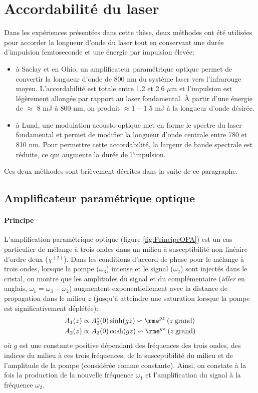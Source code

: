 \section{Accordabilité du laser}
\label{sec:Accordabilité}
Dans les expériences présentées dans cette thèse, deux méthodes ont été utilisées pour accorder la longueur d'onde du laser tout en conservant une durée d'impulsion femtoseconde et une énergie par impulsion élevée:
\begin{itemize}[label=--,leftmargin=*]
\item à Saclay et en Ohio, un amplificateur paramétrique optique permet de convertir la longueur d'onde de 800 nm du système laser vers l'infrarouge moyen. L'accordabilité est totale entre 1.2 et 2.6 $\mu$m et l'impulsion est légèrement allongée par rapport au laser fondamental. \`{A} partir d'une énergie de $\approx$ 8 mJ à 800 nm, on produit $\approx 1 - 1.5$ mJ à la longueur d'onde désirée.
\item à Lund, une modulation acousto-optique met en forme le spectre du laser fondamental et permet de modifier la longueur d'onde centrale entre 780 et 810 nm. Pour permettre cette accordabilité, la largeur de bande spectrale est réduite, ce qui augmente la durée de l'impulsion.
\end{itemize}
Ces deux méthodes sont brièvement décrites dans la suite de ce paragraphe.
\subsection{Amplificateur paramétrique optique}
\label{subsec:OPA}
\paragraph{Principe} L'amplification paramétrique optique (figure \ref{fig:PrincipeOPA}) est un cas particulier de mélange à trois ondes dans un milieu à susceptibilité non linéaire d'ordre deux ($\chi^{(2)}$). Dans les conditions d'accord de phase pour le mélange à trois ondes, lorsque la pompe ($\omega_3$) intense et le signal ($\omega_2$) sont injectés dans le cristal, on montre que les amplitudes du signal et du complémentaire (\textit{idler} en anglais, $\omega_1 = \omega_3 - \omega_2$) augmentent exponentiellement avec la distance de propagation dans le milieu $z$  (jusqu'à atteindre une saturation lorsque la pompe est significativement déplétée):
\begin{align}
A_1(z) & \propto A_2^*(0) \sinh(gz) \backsim \rme^{gz} \: (z \: \text{grand})\\
A_2(z) & \propto A_2(0) \cosh(gz) \backsim \rme^{gz} \: (z \: \text{grand}) 
\end{align}
où $g$ est une constante positive dépendant des fréquences des trois ondes, des indices du milieu à ces trois fréquences, de la susceptibilité du milieu  et de l'amplitude de la pompe (considérée comme constante). Ainsi, on constate à la fois la production de la nouvelle fréquence $\omega_1$ et l'amplification du signal à la fréquence $\omega_2$.

